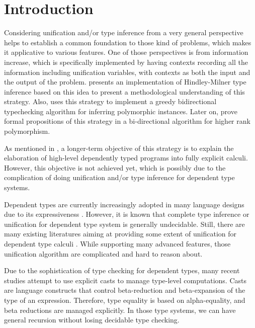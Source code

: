 \section{Introduction}

Considering unification and/or type inference from a very general perspective
helps to establish a common foundation to those kind of problems, which makes it
applicative to various features. One of those perspectives is from information
increase, which is specifically implemented by having contexts recording all the
information including unification variables, with contexts as both the input and
the output of the problem. \citet{gundry2010type} presents an implementation of
Hindley-Milner \citep{damas1982principal,hindley69principal} type inference
based on this idea to present a methodological understanding of this strategy.
Also, \citet{dunfield2009greedy} uses this strategy to implement a greedy
bidirectional typechecking algorithm for inferring polymorphic instances. Later
on, \citet{dunfield2013complete} prove formal propositions of this strategy in a
bi-directional algorithm for higher rank polymorphism.

As mentioned in \citet{gundry2010type}, a longer-term objective of this strategy
is to explain the elaboration of high-level dependently typed programs into
fully explicit calculi. However, this objective is not achieved yet, which is
possibly due to the complication of doing unification and/or type inference
for dependent type systems.

Dependent types are currently increasingly adopted in many language designs due
to its expressiveness \citep{xi1999dependent, licata2005formulation,
  pasalic2006concoqtion, mckinna2006dependent, norell2009dependently,
  brady2013idris}. However, it is known that complete type inference or
unification for dependent type system is generally undecidable. Still, there are
many existing literatures aiming at providing some extent of unification for
dependent type calculi \citep{ziliani2015unification, abel2011higher,
  elliott1989higher}. While supporting many advanced features, those unification
algorithm are complicated and hard to reason about.

Due to the sophistication of type checking for dependent types, many recent
studies \citep{van2013explicit, kimmell2012equational, sjoberg2012irrelevance,
  sjoberg2015programming, stump2009verified, sulzmann2007system,
  yang2016unified} attempt to use explicit casts to manage type-level
computations. Casts are language constructs that control beta-reduction and
beta-expansion of the type of an expression. Therefore, type equality is based
on alpha-equality, and beta reductions are managed explicitly. In those type
systems, we can have general recursion without losing decidable type checking.

